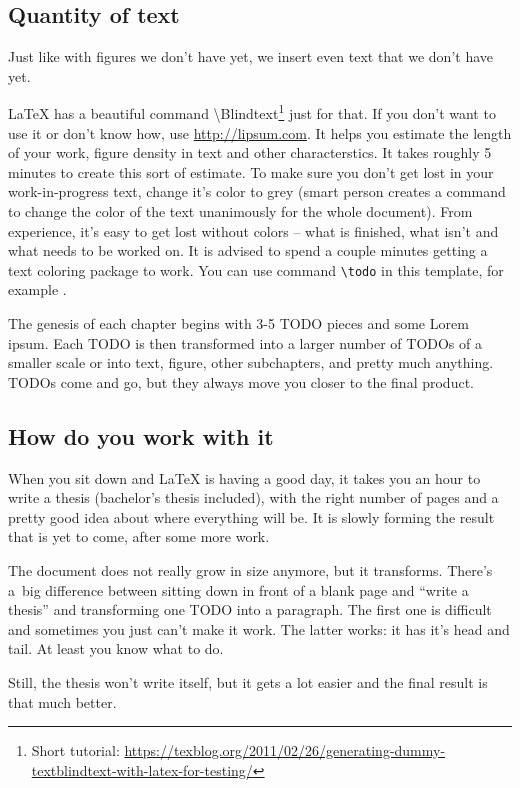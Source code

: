 {{\subsection*{Quantity of text}

Just like with figures we don't have yet, we insert even text that we don't have yet.

LaTeX has a beautiful command \textbackslash Blindtext\footnote{Short tutorial: \url{https://texblog.org/2011/02/26/generating-dummy-textblindtext-with-latex-for-testing/}} just for that. If you don't want to use it or don't know how, use \url{http://lipsum.com}. It helps you estimate the length of your work, figure density in text and other characterstics. It takes roughly 5 minutes to create this sort of estimate. To make sure you don't get lost in your work-in-progress text, change it's color to grey (smart person creates a command to change the color of the text unanimously for the whole document). From experience, it's easy to get lost without colors -- what is finished, what isn't and what needs to be worked on. It is advised to spend a couple minutes getting a text coloring package to work. You can use command \verb|\todo| in this template, for example .

The genesis of each chapter begins with 3-5 TODO pieces and some Lorem ipsum. Each TODO is then transformed into a larger number of TODOs of a smaller scale or into text, figure, other subchapters, and pretty much anything. TODOs come and go, but they always move you closer to the final product.

\subsection*{How do you work with it}

When you sit down and LaTeX is having a good day, it takes you an hour to write a thesis (bachelor's thesis included), with the right number of pages and a pretty good idea about where everything will be. It is slowly forming the result that is yet to come, after some more work.

The document does not really grow in size anymore, but it transforms. There's a~big difference between sitting down in front of a blank page and ``write a thesis'' and transforming one TODO into a paragraph. The first one is difficult and sometimes you just can't make it work. The latter works: it has it's head and tail. At least you know what to do.

Still, the thesis won't write itself, but it gets a lot easier and the final result is that much better.


}}
